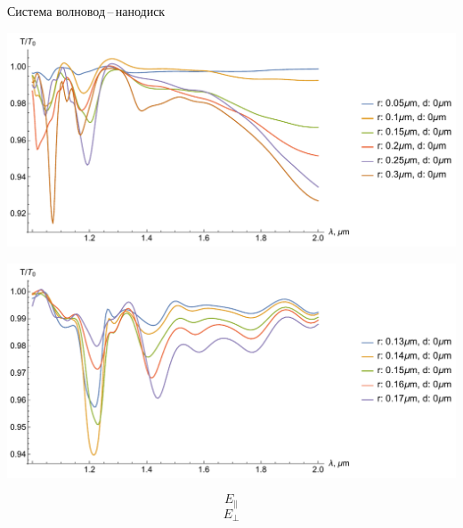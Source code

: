 \begin{frame}{Система волновод\,--\,нанодиск}
	\begin{minipage}{.8\textwidth}
		\includegraphics[width=\textwidth]{img/total_d0_theta_0}
	
		\includegraphics[width=\textwidth]{img/total_d0_theta_90-short}	
	\end{minipage}%
	\begin{minipage}{.2\textwidth}
		$$E_{\parallel}$$
		\vspace{6em}
		$$E_{\bot}$$
	\end{minipage}

\end{frame}

